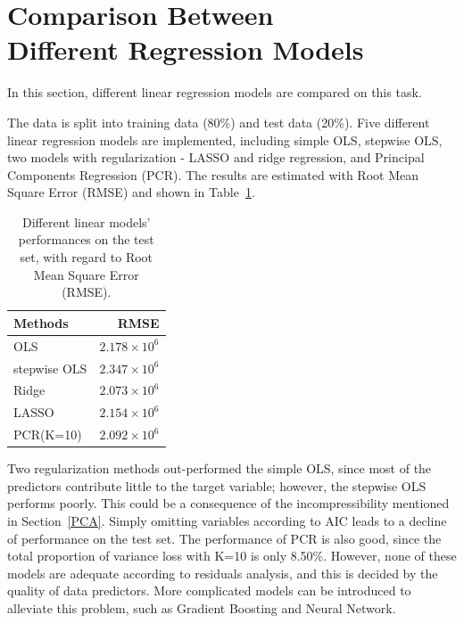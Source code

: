 \documentclass{article}
\begin{document}
\section{Comparison Between \\ Different Regression Models}

In this section, different linear regression models are compared on this task.

The data is split into training data (80\%) and test data (20\%). Five different linear regression models are implemented, including simple OLS, stepwise OLS, two models with regularization - LASSO and ridge regression, and Principal Components Regression (PCR). The results are estimated with Root Mean Square Error (RMSE) and shown in Table~\ref{tab2}.

\begin{table}[t]
\caption{Different linear models' performances on the test set, with regard to Root Mean Square Error (RMSE).}
\label{tab2}
\vskip 0.15in
\begin{center}
\begin{small}
\begin{sc}
\begin{tabular}{lr}
\toprule
Methods & RMSE \\
\midrule
OLS & $2.178 \times 10^6$ \\
stepwise OLS & $2.347 \times 10^6$ \\
Ridge & \textbf{$2.073 \times 10^6$} \\
LASSO & $2.154 \times 10^6$ \\
PCR(K=10) & $2.092 \times 10^6$ \\
\bottomrule
\end{tabular}
\end{sc}
\end{small}
\end{center}
\vskip -0.1in
\end{table}

Two regularization methods out-performed the simple OLS, since most of the predictors contribute little to the target variable; however, the stepwise OLS performs poorly. This could be a consequence of the incompressibility mentioned in Section~\ref{PCA}. Simply omitting variables according to AIC leads to a decline of performance on the test set. The performance of PCR is also good, since the total proportion of variance loss with K=10 is only 8.50\%. However, none of these models are adequate according to residuals analysis, and this is decided by the quality of data predictors. More complicated models can be introduced to alleviate this problem, such as Gradient Boosting and Neural Network.
\end{document}
